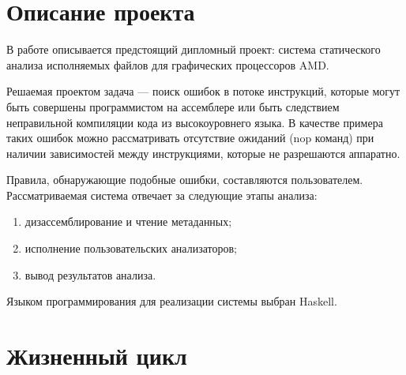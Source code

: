 \documentclass[listings]{labreport}
\begin{document}
\maketitlepage

\section*{Описание проекта}

В работе описывается предстоящий дипломный проект: система статического анализа
исполняемых файлов для графических процессоров AMD.

Решаемая проектом задача — поиск ошибок в потоке инструкций, которые могут быть
совершены программистом на ассемблере или быть следствием неправильной компиляции
кода из высокоуровнего языка. В качестве примера таких ошибок можно рассматривать
отсутствие ожиданий (nop команд) при наличии зависимостей между инструкциями,
которые не разрешаются аппаратно.

Правила, обнаружающие подобные ошибки, составляются пользователем.
Рассматриваемая система отвечает за следующие этапы анализа:
\begin{enumerate}[noitemsep,topsep=0em]
\item дизассемблирование и чтение метаданных;
\item исполнение пользовательских анализаторов;
\item вывод результатов анализа.
\end{enumerate}
\vspace{0.4em}

Языком программирования для реализации системы выбран Haskell.

\section*{Жизненный цикл}
\end{document}
